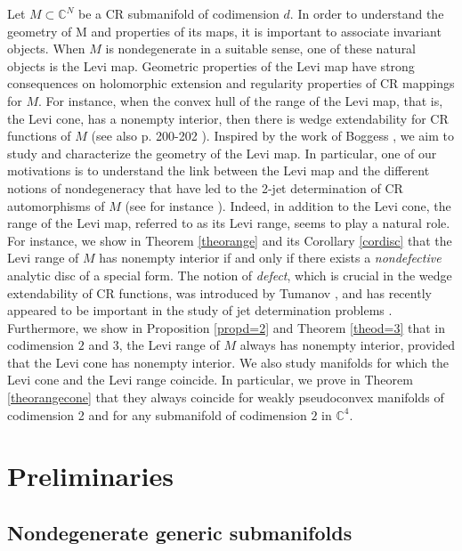 \documentclass[12pt]{amsart}
\newcommand{\C}{\mathbb C}
\theoremstyle{remark}
\theoremstyle{example}
\theoremstyle{definition}
\numberwithin{equation}{section}
\begin{document}
Let $M \subset \C^N$ be a CR submanifold of codimension $d$. In order to understand the geometry of M and properties of its maps, it is important to associate invariant objects. When $M$ is nondegenerate in a suitable sense, one of these natural objects is the Levi map. Geometric properties of the Levi map have strong consequences on holomorphic extension and regularity properties of CR mappings for $M$. For instance, when the convex hull of the range of the Levi map, that is, the Levi cone, has a nonempty interior, then there is wedge extendability for CR functions of $M$ \cite{bo-po}
(see also p. 200-202 \cite{bo}).  Inspired by the work of Boggess \cite{bo}, we aim  to study and characterize the geometry of the Levi map. In particular, one of our motivations is to understand  the link between the Levi map and the different notions of nondegeneracy that have led to the 
2-jet determination of CR automorphisms of $M$ (see for instance \cite{be1, be-bl-me,be-me,ch-mo,la-mi,tu,tu3,za}). Indeed, in addition to the Levi 
cone, the range of the Levi map, referred to as its Levi range, seems to play a natural role. For instance, we show in Theorem \ref{theorange} 
and its Corollary \ref{cordisc} that the Levi range of $M$ has nonempty interior if and only if  there exists a {\it nondefective} analytic disc of a 
special form. The notion of {\it defect},  which is crucial in the wedge extendability of CR functions,  was introduced by Tumanov \cite{tu0}, and 
has recently appeared to be important in the study of jet determination problems \cite{be-me, tu3}. Furthermore, we show in Proposition \ref{propd=2} 
and Theorem \ref{theod=3} that in codimension $2$ and $3$, the Levi range of $M$ always has  nonempty interior, provided that the Levi cone 
has   nonempty interior. We also study manifolds for which the Levi cone and the Levi range coincide. In particular, we prove in Theorem
\ref{theorangecone} that they always coincide for weakly pseudoconvex manifolds of codimension 2 and for any submanifold of codimension $2$ in $\C^4$.  

  
  


\section{Preliminaries}
\subsection{Nondegenerate generic submanifolds}
\end{document}
